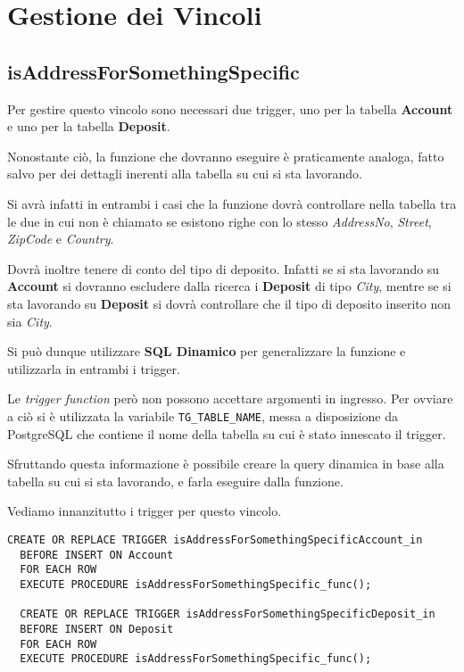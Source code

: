 \section{Gestione dei Vincoli}

\subsection{\textbf{isAddressForSomethingSpecific}}

Per gestire questo vincolo sono necessari due trigger, uno per la tabella \textbf{Account} e uno per la tabella \textbf{Deposit}.

Nonostante ciò, la funzione che dovranno eseguire è praticamente analoga, fatto salvo per dei dettagli inerenti alla tabella su cui si sta lavorando.

Si avrà infatti in entrambi i casi che la funzione dovrà controllare nella tabella tra le due in cui non è chiamato se esistono righe con lo stesso \textit{AddressNo}, \textit{Street}, \textit{ZipCode} e \textit{Country}.

Dovrà inoltre tenere di conto del tipo di deposito. Infatti se si sta lavorando su \textbf{Account} si dovranno escludere dalla ricerca i \textbf{Deposit} di tipo \textit{City}, mentre se si sta lavorando su \textbf{Deposit} si dovrà controllare che il tipo di deposito inserito non sia \textit{City}.

Si può dunque utilizzare \textbf{SQL Dinamico} per generalizzare la funzione e utilizzarla in entrambi i trigger.

Le \textit{trigger function} però non possono accettare argomenti in ingresso. Per ovviare a ciò si è utilizzata la variabile \lstinline{TG_TABLE_NAME}, messa a disposizione da PostgreSQL che contiene il nome della tabella su cui è stato innescato il trigger.

Sfruttando questa informazione è possibile creare la query dinamica in base alla tabella su cui si sta lavorando, e farla eseguire dalla funzione.

Vediamo innanzitutto i trigger per questo vincolo.

\begin{lstlisting}[caption={Creazione dei trigger per il vincolo \textbf{isAddressForSomethingSpecific}}]
  CREATE OR REPLACE TRIGGER isAddressForSomethingSpecificAccount_in
  BEFORE INSERT ON Account
  FOR EACH ROW
  EXECUTE PROCEDURE isAddressForSomethingSpecific_func();

  CREATE OR REPLACE TRIGGER isAddressForSomethingSpecificDeposit_in
  BEFORE INSERT ON Deposit
  FOR EACH ROW
  EXECUTE PROCEDURE isAddressForSomethingSpecific_func();
\end{lstlisting}

